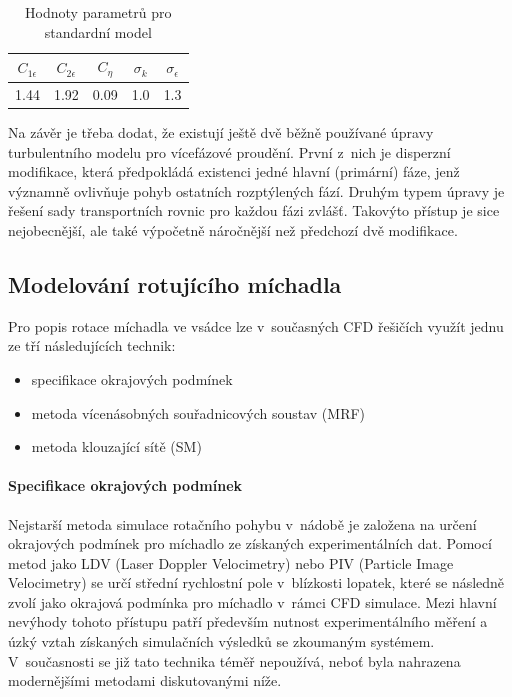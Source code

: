 \begin{table}[h!]
\centering
\caption{Hodnoty parametrů pro standardní \keps{} model}
\label{tab:const}
\begin{tabular}{ccccc}
\toprule
$C_{1\epsilon}$ & $C_{2\epsilon}$ & $C_{\eta}$ &  $\sigma_{k}$ & $\sigma_{\epsilon}$\\
\midrule
\num{1.44} & \num{1.92} & \num{0.09} & \num{1.0} & \num{1.3} \\
\bottomrule
\end{tabular}
\end{table}

Na závěr je třeba dodat, že existují ještě dvě běžně používané úpravy \keps{} turbulentního modelu pro vícefázové proudění. První z~nich je disperzní modifikace, která předpokládá existenci jedné hlavní (primární) fáze, jenž významně ovlivňuje pohyb ostatních rozptýlených fází. Druhým typem úpravy je řešení sady transportních rovnic \keps{} pro každou fázi zvlášť. Takovýto přístup je sice nejobecnější, ale také výpočetně náročnější než předchozí dvě modifikace. 

\subsection{Modelování rotujícího míchadla}
Pro popis rotace míchadla ve vsádce lze v~současných CFD řešičích využít jednu ze tří následujících technik:
\begin{itemize}[itemsep=0pt,parsep=0pt,partopsep=0pt,topsep=0pt]
  \item specifikace okrajových podmínek
  \item metoda vícenásobných souřadnicových soustav (MRF) 
  \item metoda klouzající sítě (SM) 
\end{itemize} 

\paragraph{Specifikace okrajových podmínek}
Nejstarší metoda simulace rotačního pohybu v~nádobě je založena na určení okrajových podmínek pro míchadlo ze získaných experimentálních  dat. Pomocí metod jako LDV (Laser Doppler Velocimetry) nebo PIV (Particle Image Velocimetry) se určí střední rychlostní pole v~blízkosti lopatek, které se následně zvolí jako okrajová podmínka pro míchadlo v~rámci CFD simulace. Mezi hlavní nevýhody tohoto přístupu patří především  nutnost experimentálního měření a úzký vztah získaných simulačních výsledků se zkoumaným systémem. V~současnosti se již tato technika téměř nepoužívá, neboť byla nahrazena modernějšími metodami diskutovanými níže.

